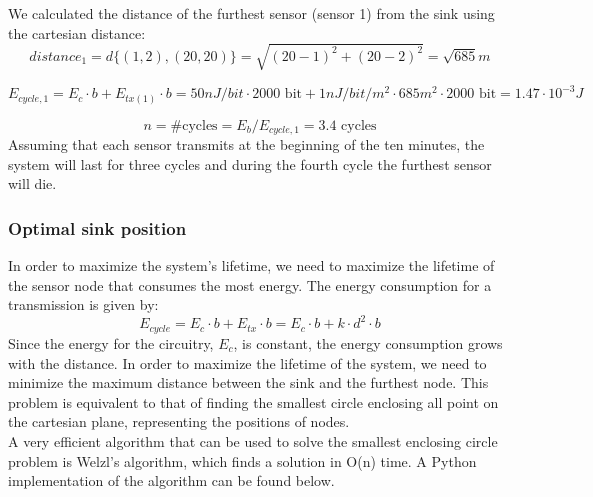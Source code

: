 We calculated the distance of the furthest sensor (sensor 1) from the sink using the cartesian distance: \[ distance_1 = d \{(1, 2) , (20, 20)\} = \sqrt{(20-1)^2 + (20-2)^2} = \sqrt{685} m \]

\[
E_{cycle, 1} = E_c \cdot b + E_{tx(1)} \cdot b = 50 nJ/bit \cdot 2000 \text{ bit} + 1 nJ/bit/m^2 \cdot 685 m^2 \cdot 2000 \text{ bit} = 1.47 \cdot 10^{-3} J
\]

\[
n = \text{\# cycles} = E_b / E_{cycle, 1} = 3.4 \text{ cycles}
\]
Assuming that each sensor transmits at the beginning of the ten minutes, the system will last for three cycles and during the fourth cycle the furthest sensor will die.

\subsubsection{Optimal sink position}
In order to maximize the system's lifetime, we need to maximize the lifetime of the sensor node that consumes the most energy. The energy consumption for a transmission is given by:
\[
E_{cycle} = E_c \cdot b + E_{tx} \cdot b = E_c \cdot b + k \cdot d^2 \cdot b
\]
Since the energy for the circuitry, $E_c$, is constant, the energy consumption grows with the distance. In order to maximize the lifetime of the system, we need to minimize the maximum distance between the sink and the furthest node. This problem is equivalent to that of finding the smallest circle enclosing all point on the cartesian plane, representing the positions of nodes.\\
A very efficient algorithm that can be used to solve the smallest enclosing circle problem is Welzl's algorithm, which finds a solution in O(n) time. A Python implementation of the algorithm can be found below.

